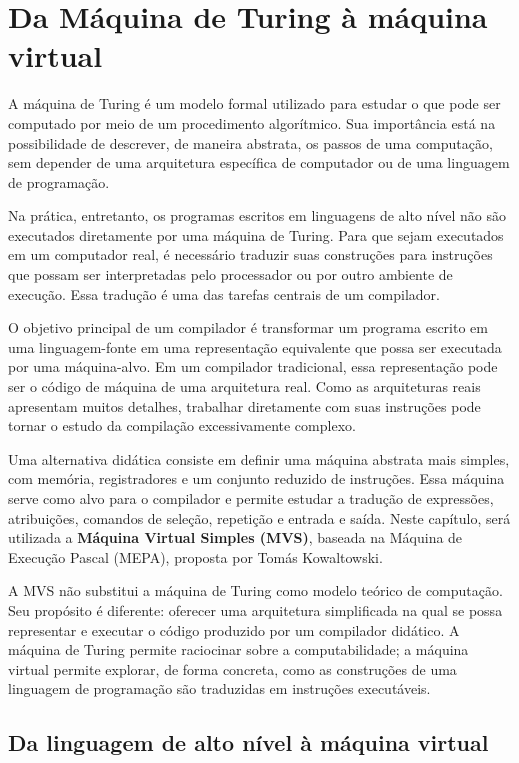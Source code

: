 \documentclass[
  brazilian,
  letterpaper,
]{book}
\theoremstyle{plain}
\theoremstyle{definition}
\theoremstyle{remark}
\begin{document}
\section{Da Máquina de Turing à máquina
virtual}\label{da-muxe1quina-de-turing-uxe0-muxe1quina-virtual}

A máquina de Turing é um modelo formal utilizado para estudar o que pode
ser computado por meio de um procedimento algorítmico. Sua importância
está na possibilidade de descrever, de maneira abstrata, os passos de
uma computação, sem depender de uma arquitetura específica de computador
ou de uma linguagem de programação.

Na prática, entretanto, os programas escritos em linguagens de alto
nível não são executados diretamente por uma máquina de Turing. Para que
sejam executados em um computador real, é necessário traduzir suas
construções para instruções que possam ser interpretadas pelo
processador ou por outro ambiente de execução. Essa tradução é uma das
tarefas centrais de um compilador.

O objetivo principal de um compilador é transformar um programa escrito
em uma linguagem-fonte em uma representação equivalente que possa ser
executada por uma máquina-alvo. Em um compilador tradicional, essa
representação pode ser o código de máquina de uma arquitetura real. Como
as arquiteturas reais apresentam muitos detalhes, trabalhar diretamente
com suas instruções pode tornar o estudo da compilação excessivamente
complexo.

Uma alternativa didática consiste em definir uma máquina abstrata mais
simples, com memória, registradores e um conjunto reduzido de
instruções. Essa máquina serve como alvo para o compilador e permite
estudar a tradução de expressões, atribuições, comandos de seleção,
repetição e entrada e saída. Neste capítulo, será utilizada a
\textbf{Máquina Virtual Simples (MVS)}, baseada na Máquina de Execução
Pascal (MEPA), proposta por Tomás Kowaltowski.

A MVS não substitui a máquina de Turing como modelo teórico de
computação. Seu propósito é diferente: oferecer uma arquitetura
simplificada na qual se possa representar e executar o código produzido
por um compilador didático. A máquina de Turing permite raciocinar sobre
a computabilidade; a máquina virtual permite explorar, de forma
concreta, como as construções de uma linguagem de programação são
traduzidas em instruções executáveis.

\subsection{Da linguagem de alto nível à máquina
virtual}\label{da-linguagem-de-alto-nuxedvel-uxe0-muxe1quina-virtual}
\end{document}
